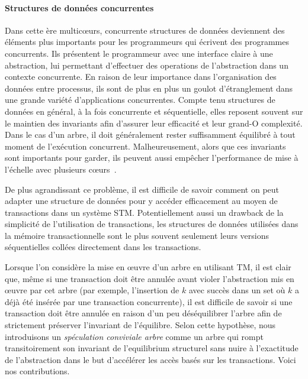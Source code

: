 \paragraph{Structures de données concurrentes}
Dans cette ère multicœurs, concurrente structures de données deviennent des éléments plus importants pour les programmeurs qui écrivent des programmes concurrents.
Ils présentent le programmeur avec une interface claire à une abstraction, lui permettant d'effectuer des operations de l'abstraction dans un contexte concurrente.
En raison de leur importance dans l'organisation des données entre processus, ils sont de plus en plus un goulot d'étranglement dans une grande variété d'applications concurrentes.
Compte tenu structures de données en général, à la fois concurrente et séquentielle, elles reposent souvent sur le maintien des invariants afin d'assurer leur efficacité et leur grand-O complexité.
Dans le cas d'un arbre, il doit généralement rester suffisamment équilibré à tout moment de l'exécution concurrent.
Malheureusement, alors que ces invariants sont importants pour garder, ils peuvent aussi empêcher l'performance de mise à l'échelle avec plusieurs cœurs~\cite{Sha2011}.


De plus agrandissant ce problème, il est difficile de savoir comment on peut adapter une structure de données pour y accéder efficacement au moyen de transactions dans un système STM.
Potentiellement aussi un drawback de la simplicité de l'utilisation de transactions,
les structures de données utilisées dans la mémoire transactionnelle sont le plus souvent seulement leurs versions séquentielles collées directement dans les transactions.



Lorsque l'on considère la mise en œuvre d'un arbre en utilisant TM, il est clair que, même si une transaction doit être annulée avant violer
l'abstraction mis en œuvre par cet arbre (par exemple, l'insertion de $k$ avec succès dans un set où $k$ a déjà été insérée par une transaction concurrente),
il est difficile de savoir si une transaction doit être annulée en raison d'un peu déséquilibrer l'arbre afin de strictement préserver l'invariant de l'équilibre.
Selon cette hypothèse, nous introduisons un \emph{spéculation conviviale arbre} comme un arbre qui rompt transitoirement son invariant de l'equilibrium structurel
sans nuire à l'exactitude de l'abstraction dans le but d'accélérer les accès basés sur les transactions.
Voici nos contributions.



